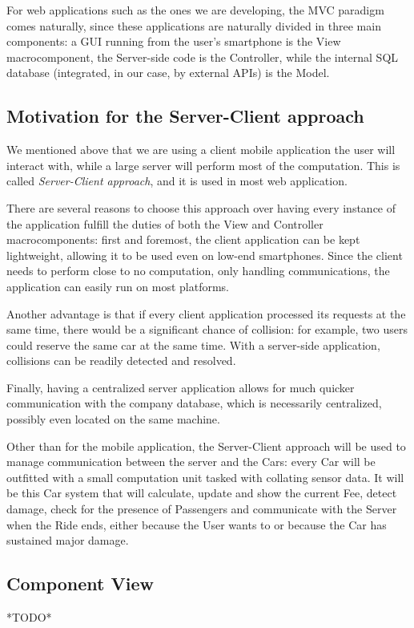\documentclass[12pt]{article}
\begin{document}
For web applications such as the ones we are developing, the MVC paradigm comes naturally, since these applications are naturally divided in three main components: a GUI running from the user's smartphone is the View macrocomponent, the Server-side code is the Controller, while the internal SQL database (integrated, in our case, by external APIs) is the Model.

\subsection{Motivation for the Server-Client approach}
We mentioned above that we are using a client mobile application the user will interact with, while a large server will perform most of the computation. This is called \emph{Server-Client approach}, and it is used in most web application.

There are several reasons to choose this approach over having every instance of the application fulfill the duties of both the View and Controller macrocomponents: first and foremost, the client application can be kept lightweight, allowing it to be used even on low-end smartphones. Since the client needs to perform close to no computation, only handling communications, the application can easily run on most platforms.

Another advantage is that if every client application processed its requests at the same time, there would be a significant chance of collision: for example, two users could reserve the same car at the same time. With a server-side application, collisions can be readily detected and resolved.

Finally, having a centralized server application allows for much quicker communication with the company database, which is necessarily centralized, possibly even located on the same machine.

Other than for the mobile application, the Server-Client approach will be used to manage communication between the server and the Cars: every Car will be outfitted with a small computation unit tasked with collating sensor data. It will be this Car system that will calculate, update and show the current Fee, detect damage, check for the presence of Passengers and communicate with the Server when the Ride ends, either because the User wants to or because the Car has sustained major damage.

\subsection{Component View}
*TODO*
\end{document}
